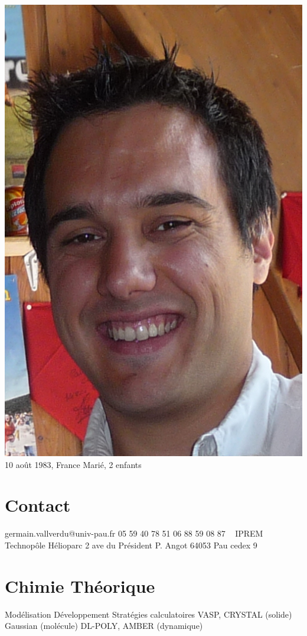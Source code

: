 \documentclass[french]{cv-style}      %
\begin{document}
\lastupdated


\begin{aside}
    \includegraphics[width=.9\columnwidth]{img/germain}
    10 août 1983, France
    Marié, 2 enfants
    \section{Contact}
    germain.vallverdu@univ-pau.fr
    05 59 40 78 51
    06 88 59 08 87
    ~
    IPREM
    Technopôle Hélioparc
    2 ave du Président P. Angot
    64053 Pau cedex 9
    \section{Chimie Théorique}
    Modélisation
    Développement
    Stratégies calculatoires
    VASP, CRYSTAL (solide)
    Gaussian (molécule)
    DL-POLY, AMBER (dynamique)

\end{aside}
\end{document}
